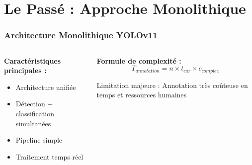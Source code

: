 \documentclass[
	11pt,
	aspectratio=169,
]{beamer}
\begin{document}
\section{Le Passé : Approche Monolithique}

\begin{frame}
	\frametitle{Architecture Monolithique YOLOv11}
	
	\begin{columns}[c]
		\begin{column}{0.5\textwidth}
			\textbf{Caractéristiques principales :}
			\begin{itemize}
				\item Architecture unifiée
				\item Détection + classification simultanées
				\item Pipeline simple
				\item Traitement temps réel
			\end{itemize}
		\end{column}
		
		\begin{column}{0.5\textwidth}
			\textbf{Formule de complexité :}
			\begin{equation*}
				T_{annotation} = n \times t_{car} \times c_{complex}
			\end{equation*}
			
			\bigskip
			
			\alert{Limitation majeure :} Annotation très coûteuse en temps et ressources humaines
		\end{column}
	\end{columns}
\end{frame}

\end{document}
